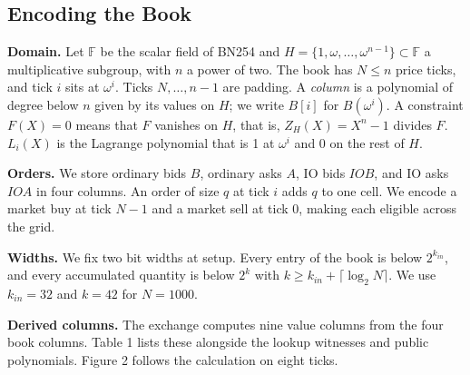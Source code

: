 \subsection{Encoding the Book}

\textbf{Domain.} Let \(\mathbb{F}\) be the scalar field of BN254 and \(H = \{1, \omega, \ldots, \omega^{n-1}\} \subset \mathbb{F}\) a multiplicative subgroup, with \(n\) a power of two. The book has \(N \le n\) price ticks, and tick \(i\) sits at \(\omega^i\). Ticks \(N, \ldots, n-1\) are padding. A \emph{column} is a polynomial of degree below \(n\) given by its values on \(H\); we write \(B[i]\) for \(B(\omega^i)\). A constraint \(F(X) = 0\) means that \(F\) vanishes on \(H\), that is, \(Z_H(X) = X^n - 1\) divides \(F\). \(L_i(X)\) is the Lagrange polynomial that is 1 at \(\omega^i\) and 0 on the rest of \(H\).

\textbf{Orders.} We store ordinary bids \(B\), ordinary asks \(A\), IO bids \(IOB\), and IO asks \(IOA\) in four columns. An order of size \(q\) at tick \(i\) adds \(q\) to one cell. We encode a market buy at tick \(N-1\) and a market sell at tick 0, making each eligible across the grid.

\textbf{Widths.} We fix two bit widths at setup. Every entry of the book is below \(2^{k_{in}}\), and every accumulated quantity is below \(2^k\) with \(k \ge k_{in} + \lceil \log_2 N \rceil\). We use \(k_{in} = 32\) and \(k = 42\) for \(N = 1000\).

\textbf{Derived columns.} The exchange computes nine value columns from the four book columns. Table 1 lists these alongside the lookup witnesses and public polynomials. Figure 2 follows the calculation on eight ticks.

